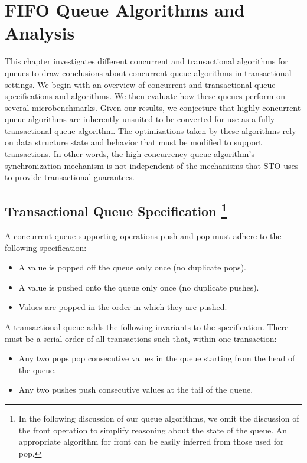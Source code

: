 \chapter{FIFO Queue Algorithms and Analysis}
\label{queue}

This chapter investigates different concurrent and transactional algorithms for queues to draw conclusions about concurrent queue algorithms in transactional settings. We begin with an overview of concurrent and transactional queue specifications and algorithms. We then evaluate how these queues perform on several microbenchmarks. Given our results, we conjecture that highly-concurrent queue algorithms are inherently unsuited to be converted for use as a fully transactional queue algorithm. The optimizations taken by these algorithms rely on data structure state and behavior that must be modified to support transactions. In other words, the high-concurrency queue algorithm's synchronization mechanism is not independent of the mechanisms that STO uses to provide transactional guarantees.

\section[Transactional Queue Specification]{Transactional Queue Specification
\footnote{In the following discussion of our queue algorithms, we omit the discussion of the front operation to simplify reasoning about the state of the queue. An appropriate algorithm for front can be easily inferred from those used for pop.}}

A concurrent queue supporting operations push and pop must adhere to the following specification:
\begin{itemize}
    \item A value is popped off the queue only once (no duplicate pops).
    \item A value is pushed onto the queue only once (no duplicate pushes).
    \item Values are popped in the order in which they are pushed.
\end{itemize}

\noindent
A transactional queue adds the following invariants to the specification. There must be a serial order of all transactions such that, within one transaction:
\begin{itemize}
    \item Any two pops pop consecutive values in the queue starting from the head of the queue.
    \item Any two pushes push consecutive values at the tail of the queue.
\end{itemize}

